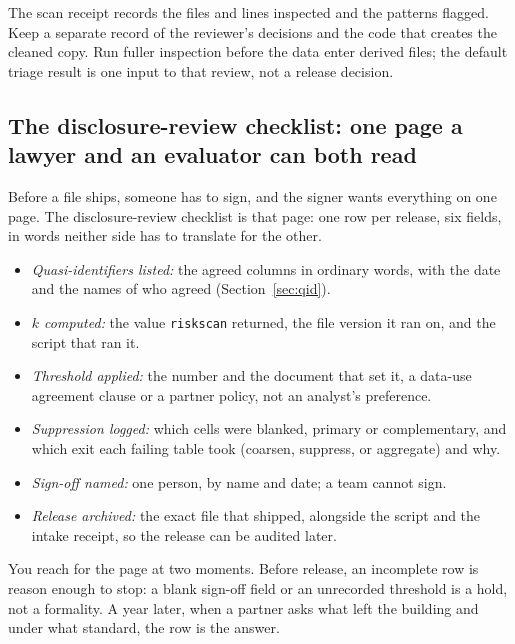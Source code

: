 The scan receipt records the files and lines inspected and the patterns flagged. Keep a separate record of the reviewer's decisions and the code that creates the cleaned copy. Run fuller inspection before the data enter derived files; the default triage result is one input to that review, not a release decision.

\subsection{The disclosure-review checklist: one page a lawyer and an evaluator can both read}\label{ch14-sc-checklist}
Before a file ships, someone has to sign, and the signer wants everything on one page. The disclosure-review checklist is that page: one row per release, six fields, in words neither side has to translate for the other.
\begin{itemize}
\item \emph{Quasi-identifiers listed:} the agreed columns in ordinary words, with the date and the names of who agreed (Section~\ref{sec:qid}).
\item \emph{$k$ computed:} the value \texttt{riskscan} returned, the file version it ran on, and the script that ran it.
\item \emph{Threshold applied:} the number and the document that set it, a data-use agreement clause or a partner policy, not an analyst's preference.
\item \emph{Suppression logged:} which cells were blanked, primary or complementary, and which exit each failing table took (coarsen, suppress, or aggregate) and why.
\item \emph{Sign-off named:} one person, by name and date; a team cannot sign.
\item \emph{Release archived:} the exact file that shipped, alongside the script and the intake receipt, so the release can be audited later.
\end{itemize}
You reach for the page at two moments. Before release, an incomplete row is reason enough to stop: a blank sign-off field or an unrecorded threshold is a hold, not a formality. A year later, when a partner asks what left the building and under what standard, the row is the answer.

